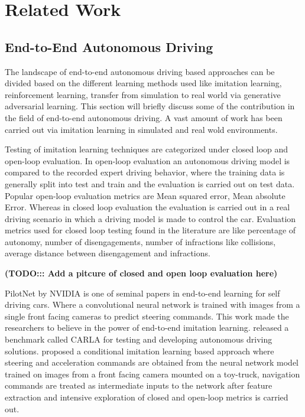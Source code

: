 

    \chapter{Related Work}


    \section{End-to-End Autonomous Driving}
    The landscape of end-to-end autonomous driving based approaches can be divided based on the different learning methods used like imitation learning, reinforcement learning, transfer from simulation to real world via generative adversarial learning.
This section will briefly discuss some of the contribution in the field of end-to-end autonomous driving. A vast amount of work has been carried out via imitation learning in simulated and real wold environments. 
\par Testing of imitation learning techniques are categorized under closed loop and open-loop evaluation. In open-loop evaluation an autonomous driving model is compared to the recorded expert driving behavior, where the training data is generally split into test and train and the evaluation is carried out on test data. Popular open-loop evaluation metrics are Mean squared error, Mean absolute Error. Whereas in closed loop evaluation the evaluation is carried out in a real driving scenario in which a driving model is made to control the car. Evaluation metrics used for closed loop testing found in the literature are like percentage of autonomy, number of disengagements, number of infractions like collisions, average distance between disengagement and infractions.

\textbf{({{TODO::: Add a pitcure of closed and open loop evaluation here}})}

\cite{DBLP:journals/corr/BojarskiTDFFGJM16} PilotNet by NVIDIA is one of seminal papers in end-to-end learning for self driving cars. Where a convolutional neural network is trained with images from a single front facing cameras to predict steering commands.  This work made the researchers to believe in the power of end-to-end imitation learning. \cite{DBLP:journals/corr/abs-1711-03938} released a benchmark  called CARLA for testing and developing autonomous driving solutions. \cite{DBLP:journals/corr/abs-1710-02410} proposed a conditional imitation learning based approach where steering and acceleration commands are obtained from the neural network model trained on images from a front facing camera mounted on a toy-truck, navigation commands are treated as intermediate inputs to the network after feature extraction and intensive exploration of closed and open-loop metrics is carried out.

